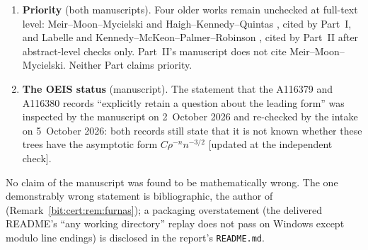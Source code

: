 \documentclass[11pt]{article}
\theoremstyle{definition}\newtheorem{definition}[theorem]{Definition}
\theoremstyle{remark}\newtheorem{remark}[theorem]{Remark}
\begin{document}
\begin{enumerate}
 addresses it. (Haigh--Kennedy--Quintas \cite{hkq} count identity trees of
 bounded degree with fixed diameter; their full text, and so their degree
 convention, has not been checked, and comparing conventions is Part~I's
 question~5.)
\item \textbf{Priority} (both manuscripts). Four older works remain unchecked at
 full-text level: Meir--Moon--Mycielski \cite{mmm} and Haigh--Kennedy--Quintas
 \cite{hkq}, cited by Part~I, and Labelle \cite{labelle} and
 Kennedy--McKeon--Palmer--Robinson \cite{kmpr}, cited by Part~II after
 abstract-level checks only. Part~II's manuscript does not cite
 Meir--Moon--Mycielski. Neither Part claims priority.
\item \textbf{The OEIS status} (manuscript). The statement that the A116379 and
 A116380 records ``explicitly retain a question about the leading form'' was
 inspected by the manuscript on 2~October 2026 and re-checked by the intake on
 5~October 2026: both records still state that it is not known whether these
 trees have the asymptotic form $C\rho^{-n}n^{-3/2}$ \textup{[}updated at the
 independent check\textup{]}.
\end{enumerate}
No claim of the manuscript was found to be mathematically wrong. The one
demonstrably wrong statement is bibliographic, the author of \cite{hkq}
(Remark~\ref{bit:cert:rem:furnas}); a packaging overstatement (the delivered
README's ``any working directory'' replay does not pass on Windows except
modulo line endings) is disclosed in the report's \texttt{README.md}.
\end{document}
